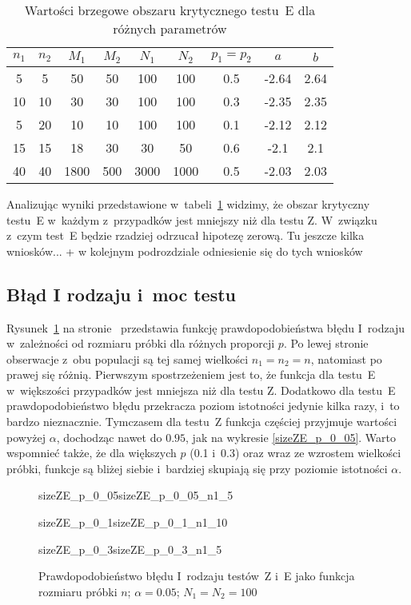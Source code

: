 \begin{table}
\centering
\caption{Wartości brzegowe obszaru krytycznego testu~E dla różnych parametrów}
\label{r3:tabab}
\begin{tabular}{|c|c|c|c|c|c|c|c|c|} \hline
	$n_1$ & $n_2$ & $M_1$ & $M_2$ & $N_1$ & $N_2$ & $p_1 = p_2$ & $a$ & $b$ \\
	\hline \hline
	5 & 5 & 50 & 50 & 100 & 100 & 0.5 & -2.64 & 2.64 \\
	10 & 10 & 30 & 30 & 100 & 100 & 0.3 & -2.35 & 2.35 \\
	5 & 20 & 10 & 10 & 100 & 100 & 0.1 & -2.12 & 2.12 \\
	15 & 15 & 18 & 30 & 30 & 50 & 0.6 & -2.1 & 2.1 \\
	40 & 40 & 1800 & 500 & 3000 & 1000 & 0.5 & -2.03 & 2.03 \\
	\hline
\end{tabular}
\end{table}

Analizując wyniki przedstawione w~tabeli~\ref{r3:tabab} widzimy, że obszar krytyczny testu~E w~każdym z~przypadków jest mniejszy niż dla testu Z. W~związku z~czym test~E będzie rzadziej odrzucał hipotezę zerową. Tu jeszcze kilka wniosków... + w kolejnym podrozdziale odniesienie się do tych wniosków

\subsection{Błąd I rodzaju i~moc testu}
Rysunek~\ref{sizeZE_n} na stronie~\pageref{sizeZE_n} przedstawia funkcję prawdopodobieństwa błędu I~rodzaju w~zależności od rozmiaru próbki dla różnych proporcji $p$. Po lewej stronie obserwacje z~obu populacji są tej samej wielkości $n_1=n_2=n$, natomiast po prawej się różnią. Pierwszym spostrzeżeniem jest to, że funkcja dla testu~E w~większości przypadków jest mniejsza niż dla testu Z. Dodatkowo dla testu~E prawdopodobieństwo błędu przekracza poziom istotności jedynie kilka razy, i~to bardzo nieznacznie. Tymczasem dla testu~Z funkcja częściej przyjmuje wartości powyżej $\alpha$, dochodząc nawet do $0.95$, jak na wykresie \ref{sizeZE_p_0_05}. Warto wspomnieć także, że dla większych $p$ (0.1 i~0.3) oraz wraz ze wzrostem wielkości próbki, funkcje są bliżej siebie i~bardziej skupiają się przy poziomie istotności $\alpha$.

\begin{figure}[p]
	\begin{subdiagrams}{sizeZE_p_0_05}{sizeZE_p_0_05_n1_5}
	\end{subdiagrams}
	
	\begin{subdiagrams}{sizeZE_p_0_1}{sizeZE_p_0_1_n1_10}
	\end{subdiagrams}
	
	\begin{subdiagrams}{sizeZE_p_0_3}{sizeZE_p_0_3_n1_5}
	\end{subdiagrams}
	\caption{Prawdopodobieństwo błędu I~rodzaju testów~Z i~E jako funkcja rozmiaru próbki $n$; $\alpha=0.05$; $N_1=N_2=100$}
	\label{sizeZE_n}
\end{figure}

